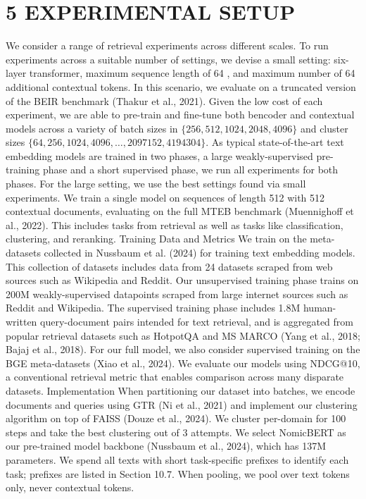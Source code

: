 \section*{5 EXPERIMENTAL SETUP}
We consider a range of retrieval experiments across different scales. To run experiments across a suitable number of settings, we devise a small setting: six-layer transformer, maximum sequence length of 64 , and maximum number of 64 additional contextual tokens. In this scenario, we evaluate on a truncated version of the BEIR benchmark (Thakur et al., 2021). Given the low cost of each experiment, we are able to pre-train and fine-tune both bencoder and contextual models across a variety of batch sizes in \(\{256,512,1024,2048,4096\}\) and cluster sizes \(\{64,256,1024,4096, \ldots, 2097152,4194304\}\). As typical state-of-the-art text embedding models are trained in two phases, a large weakly-supervised pre-training phase and a short supervised phase, we run all experiments for both phases.
For the large setting, we use the best settings found via small experiments. We train a single model on sequences of length 512 with 512 contextual documents, evaluating on the full MTEB benchmark (Muennighoff et al., 2022). This includes tasks from retrieval as well as tasks like classification, clustering, and reranking.
Training Data and Metrics We train on the meta-datasets collected in Nussbaum et al. (2024) for training text embedding models. This collection of datasets includes data from 24 datasets scraped from web sources such as Wikipedia and Reddit. Our unsupervised training phase trains on 200M weakly-supervised datapoints scraped from large internet sources such as Reddit and Wikipedia. The supervised training phase includes 1.8M human-written query-document pairs intended for text retrieval, and is aggregated from popular retrieval datasets such as HotpotQA and MS MARCO (Yang et al., 2018; Bajaj et al., 2018). For our full model, we also consider supervised training on the BGE meta-datasets (Xiao et al., 2024). We evaluate our models using NDCG@10, a conventional retrieval metric that enables comparison across many disparate datasets.
Implementation When partitioning our dataset into batches, we encode documents and queries using GTR (Ni et al., 2021) and implement our clustering algorithm on top of FAISS (Douze et al., 2024). We cluster per-domain for 100 steps and take the best clustering out of 3 attempts. We select NomicBERT as our pre-trained model backbone (Nussbaum et al., 2024), which has 137M parameters. We spend all texts with short task-specific prefixes to identify each task; prefixes are listed in Section 10.7. When pooling, we pool over text tokens only, never contextual tokens.
